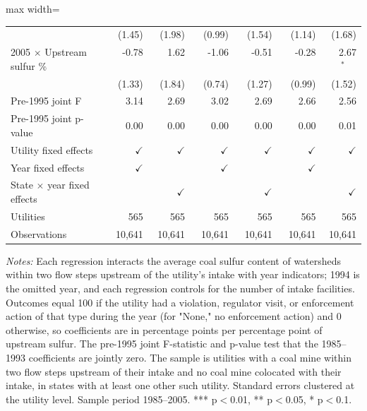 \begin{table}[htbp]
{\begin{adjustbox}{max width=\linewidth}
\begin{tabular}{lrrrrrr}
 & (\phantom{-}1.45)\phantom{$^{***}$} & (\phantom{-}1.98)\phantom{$^{***}$} & (\phantom{-}0.99)\phantom{$^{***}$} & (\phantom{-}1.54)\phantom{$^{***}$} & (\phantom{-}1.14)\phantom{$^{***}$} & (\phantom{-}1.68)\phantom{$^{***}$} \\
2005 $\times$ Upstream sulfur \% & \phantom{(}-0.78$^{\phantom{*}\phantom{*}\phantom{*}}$ & \phantom{(}\phantom{-}1.62$^{\phantom{*}\phantom{*}\phantom{*}}$ & \phantom{(}-1.06$^{\phantom{*}\phantom{*}\phantom{*}}$ & \phantom{(}-0.51$^{\phantom{*}\phantom{*}\phantom{*}}$ & \phantom{(}-0.28$^{\phantom{*}\phantom{*}\phantom{*}}$ & \phantom{(}\phantom{-}2.67$^{*\phantom{*}\phantom{*}}$ \\
 & (\phantom{-}1.33)\phantom{$^{***}$} & (\phantom{-}1.84)\phantom{$^{***}$} & (\phantom{-}0.74)\phantom{$^{***}$} & (\phantom{-}1.27)\phantom{$^{***}$} & (\phantom{-}0.99)\phantom{$^{***}$} & (\phantom{-}1.52)\phantom{$^{***}$} \\
\hline
Pre-1995 joint F & 3.14 & 2.69 & 3.02 & 2.69 & 2.66 & 2.56 \\
Pre-1995 joint p-value & 0.00 & 0.00 & 0.00 & 0.00 & 0.00 & 0.01 \\
Utility fixed effects & $\checkmark$ & $\checkmark$ & $\checkmark$ & $\checkmark$ & $\checkmark$ & $\checkmark$ \\
Year fixed effects & $\checkmark$ &  & $\checkmark$ &  & $\checkmark$ &  \\
State $\times$ year fixed effects &  & $\checkmark$ &  & $\checkmark$ &  & $\checkmark$ \\
Utilities & 565 & 565 & 565 & 565 & 565 & 565 \\
Observations & 10,641 & 10,641 & 10,641 & 10,641 & 10,641 & 10,641 \\
\bottomrule
\end{tabular}
\end{adjustbox}
}
\begin{minipage}{\linewidth}
\vspace{4pt}
\footnotesize
\raggedright
\textit{Notes:} Each regression interacts the average coal sulfur content of watersheds within two flow steps upstream of the utility's intake with year indicators; 1994 is the omitted year, and each regression controls for the number of intake facilities. Outcomes equal 100 if the utility had a violation, regulator visit, or enforcement action of that type during the year (for "None," no enforcement action) and 0 otherwise, so coefficients are in percentage points per percentage point of upstream sulfur. The pre-1995 joint F-statistic and p-value test that the 1985--1993 coefficients are jointly zero. The sample is utilities with a coal mine within two flow steps upstream of their intake and no coal mine colocated with their intake, in states with at least one other such utility. Standard errors clustered at the utility level. Sample period 1985--2005. *** p$<$0.01, ** p$<$0.05, * p$<$0.1.
\end{minipage}
\end{table}
